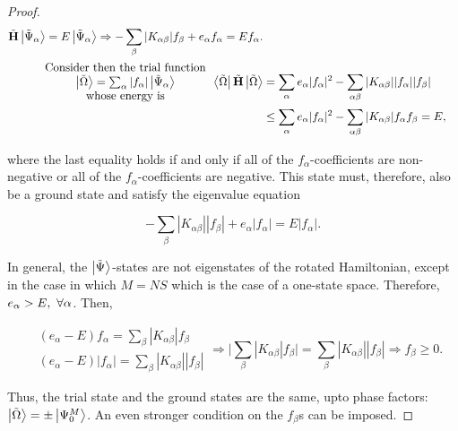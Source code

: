 \documentclass{homework}
\begin{document}
\begin{proof}
\begin{equation*}\begin{split}
    \tilde{{\bf H}} \ket{\tilde{\Psi}_{\alpha}} = E \ket{\tilde{\Psi}_{\alpha}} \Rightarrow - \sum_{\beta} |K_{\alpha \beta}| f_{\beta} + e_{\alpha} f_{\alpha} = E f_{\alpha}. \\
    \begin{array}{c}
         \textnormal{Consider then the trial function} \\
          \ket{\tilde{\Omega}} = \sum_{\alpha} |f_{\alpha}| \ket{\tilde{\Psi}_{\alpha}} \\
          \textnormal{ whose energy is }
    \end{array}
    \bra{\tilde{\Omega}} \tilde{{\bf H}} \ket{\tilde{\Omega}} &=  \sum_{\alpha} e_{\alpha} |f_{\alpha}|^2 - \sum_{\alpha \beta} |K_{\alpha \beta}| |f_{\alpha}| |f_{\beta}| \\
    & \leq \sum_{\alpha} e_{\alpha} |f_{\alpha}|^2 - \sum_{\alpha \beta} |K_{\alpha \beta}| f_{\alpha} f_{\beta} = E,
\end{split}
\end{equation*}

where the last equality holds if and only if all of the $f_{\alpha}$-coefficients are non-negative or all of the $f_{\alpha}$-coefficients are negative. This state must, therefore, also be a ground state and satisfy the eigenvalue equation 

$$
    - \sum_{\beta} |K_{\alpha \beta}| |f_{\beta}| + e_{\alpha} |f_{\alpha}| = E |f_{\alpha}|.
$$

In general, the $\ket{\tilde{\Psi}}$-states are not eigenstates of the rotated Hamiltonian, except in the case in which $M = NS$ which is the case of a one-state space. Therefore, $e_{\alpha} > E, \textnormal{ } \forall \alpha$. Then, 

\begin{equation}
    \begin{split}
    &(e_{\alpha} - E) f_{\alpha }= \sum_{\beta} |K_{\alpha \beta}| f_\beta \\
    &(e_{\alpha} - E) |f_{\alpha}|= \sum_{\beta} |K_{\alpha \beta}| |f_\beta|  
    \end{split} \Rightarrow \bigg|\sum_{\beta} |K_{\alpha \beta}| f_{\beta}\bigg| = \sum_{\beta} |K_{\alpha \beta}| |f_{\beta}| \Rightarrow f_{\beta} \geq 0.
\end{equation}

Thus, the trial state and the ground states are the same, upto phase factors: $\ket{\tilde{\Omega}} = \pm \ket{\Psi^M_0}$. An even stronger condition on the $f_{\beta}$s can be imposed.


\end{proof}
\end{document}
